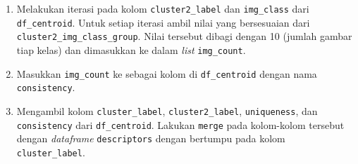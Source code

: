 \begin{enumerate}
	\item Melakukan iterasi pada kolom \texttt{cluster2\_label} dan \texttt{img\_class} dari \texttt{df\_centroid}. Untuk setiap iterasi ambil nilai yang bersesuaian dari \texttt{cluster2\_img\_class\_group}. Nilai tersebut dibagi dengan 10 (jumlah gambar tiap kelas) dan dimasukkan ke dalam \textit{list} \texttt{img\_count}.
	\item Masukkan \texttt{img\_count} ke sebagai kolom di \texttt{df\_centroid} dengan nama \texttt{consistency}.
	\item Mengambil kolom \texttt{cluster\_label}, \texttt{cluster2\_label}, \texttt{uniqueness}, dan \texttt{consistency} dari \texttt{df\_centroid}. Lakukan \texttt{merge} pada kolom-kolom tersebut dengan \textit{dataframe} \texttt{descriptors} dengan bertumpu pada kolom \texttt{cluster\_label}.
\end{enumerate}

